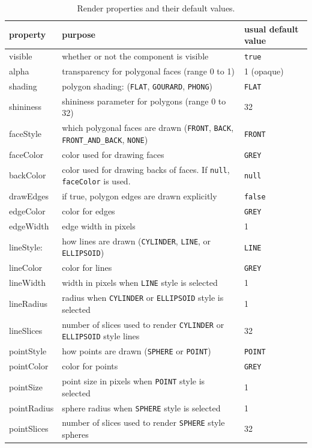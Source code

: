 \begin{table}
\begin{center}
\begin{tabular}{|lll|}
\hline property & purpose & usual default value \\ \hline
visible & whether or not the component is visible & {\tt true} \\
alpha & transparency for polygonal faces (range 0 to 1) & 1 (opaque) \\
shading & polygon shading: ({\tt FLAT}, {\tt GOURARD}, {\tt PHONG}) & {\tt FLAT}\\
shininess & shininess parameter for polygons (range 0 to 32) & 32 \\
\hline
faceStyle &
which polygonal faces are drawn ({\tt FRONT}, {\tt BACK},
{\tt FRONT\_AND\_BACK}, {\tt NONE}) & {\tt FRONT} \\
faceColor &
color used for drawing faces & {\tt GREY} \\
backColor &
color used for drawing backs of faces. If {\tt null}, {\tt faceColor} is used. &
{\tt null} \\
drawEdges & if true, polygon edges are drawn explicitly & {\tt false} \\
\hline
edgeColor & color for edges & {\tt GREY} \\
edgeWidth & edge width in pixels & 1 \\
\hline
lineStyle: &
how lines are drawn ({\tt CYLINDER}, {\tt LINE}, or {\tt ELLIPSOID}) & 
{\tt LINE} \\
lineColor & color for lines & {\tt GREY} \\
lineWidth & width in pixels when {\tt LINE} style is selected & 1 \\
lineRadius & radius when {\tt CYLINDER} or {\tt ELLIPSOID} style is selected &
1 \\
lineSlices &
number of slices used to render {\tt CYLINDER} or {\tt ELLIPSOID} style lines &
32 \\
\hline
pointStyle & how points are drawn ({\tt SPHERE} or {\tt POINT}) & {\tt POINT} \\
pointColor & color for points & {\tt GREY} \\
pointSize & point size in pixels when {\tt POINT} style is selected & 1 \\
pointRadius & sphere radius when {\tt SPHERE} style is selected & 1 \\
pointSlices & number of slices used to render {\tt SPHERE} style spheres & 32 \\
\hline
\end{tabular}
\end{center}
\caption{Render properties and their default values.}
\label{RenderProps:tab}
\end{table}

